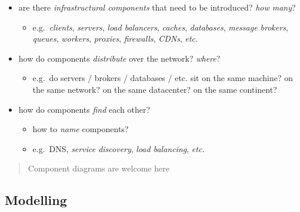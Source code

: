\documentclass{scrartcl}
\begin{document}
\begin{itemize}
  \item are there \emph{infrastructural components} that need to be introduced? \emph{how many}?
  \begin{itemize}
    \item e.g.~\emph{clients}, \emph{servers}, \emph{load balancers},
    \emph{caches}, \emph{databases}, \emph{message brokers},
    \emph{queues}, \emph{workers}, \emph{proxies}, \emph{firewalls},
    \emph{CDNs}, \emph{etc.}
  \end{itemize}

  \item how do components \emph{distribute} over the network? \emph{where}?
  \begin{itemize}
    \item e.g.~do servers / brokers / databases / etc. sit on the same
    machine? on the same network? on the same datacenter? on the same
    continent?
  \end{itemize}

  \item how do components \emph{find} each other?
  \begin{itemize}
    \item how to \emph{name} components?
    \item e.g.~DNS, \emph{service discovery}, \emph{load balancing},
    \emph{etc.}
  \end{itemize}
\end{itemize}

\begin{quote}
Component diagrams are welcome here
\end{quote}

\subsection{Modelling}\label{modelling}
\end{document}
